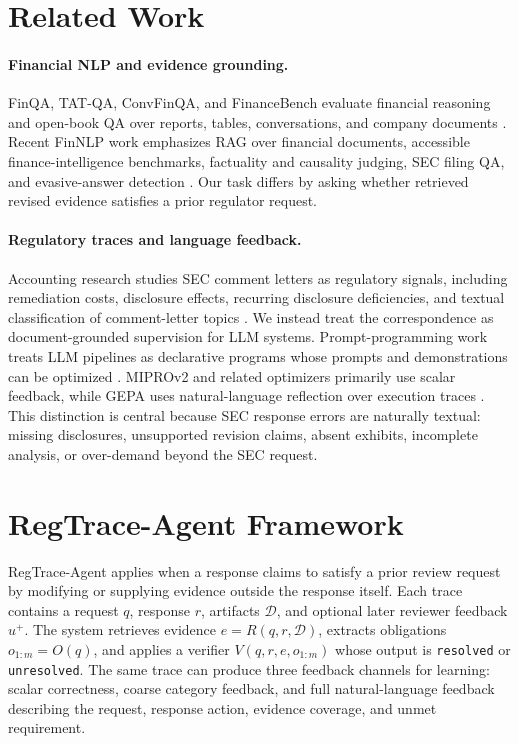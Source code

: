 \documentclass[11pt]{article}
\newcommand{\framework}{RegTrace-Agent}
\begin{document}
\section{Related Work}

\paragraph{Financial NLP and evidence grounding.}
FinQA, TAT-QA, ConvFinQA, and FinanceBench evaluate financial reasoning and open-book QA over reports, tables, conversations, and company documents \citep{chen2021finqa,zhu2021tatqa,chen2022convfinqa,islam2023financebench}. Recent FinNLP work emphasizes RAG over financial documents, accessible finance-intelligence benchmarks, factuality and causality judging, SEC filing QA, and evasive-answer detection \citep{lithgow2025rag,klimaszewski2025avenibench,lai2025secqa,nuaimi2025evasive,wu2025nli}. Our task differs by asking whether retrieved revised evidence satisfies a prior regulator request.

\paragraph{Regulatory traces and language feedback.}
Accounting research studies SEC comment letters as regulatory signals, including remediation costs, disclosure effects, recurring disclosure deficiencies, and textual classification of comment-letter topics \citep{cassell2013sec,bozanic2017sec,baugh2023auditor,ryans2021comment}. We instead treat the correspondence as document-grounded supervision for LLM systems. Prompt-programming work treats LLM pipelines as declarative programs whose prompts and demonstrations can be optimized \citep{khattab2023dspy}. MIPROv2 and related optimizers primarily use scalar feedback, while GEPA uses natural-language reflection over execution traces \citep{agrawal2026gepa}. This distinction is central because SEC response errors are naturally textual: missing disclosures, unsupported revision claims, absent exhibits, incomplete analysis, or over-demand beyond the SEC request.

\section{\framework{} Framework}

\framework{} applies when a response claims to satisfy a prior review request by modifying or supplying evidence outside the response itself. Each trace contains a request $q$, response $r$, artifacts $\mathcal{D}$, and optional later reviewer feedback $u^+$. The system retrieves evidence $e=R(q,r,\mathcal{D})$, extracts obligations $o_{1:m}=O(q)$, and applies a verifier $V(q,r,e,o_{1:m})$ whose output is \texttt{resolved} or \texttt{unresolved}. The same trace can produce three feedback channels for learning: scalar correctness, coarse category feedback, and full natural-language feedback describing the request, response action, evidence coverage, and unmet requirement.
\end{document}
